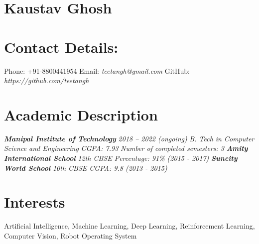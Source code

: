 \documentclass[a4paper,12pt]{article}
\begin{document}
    


\begin{multicols}{2}
\section*{\LARGE{Kaustav Ghosh}}
    \section*{Contact Details:}
        Phone: +91-8800441954
        \newline
        Email: \textit{teetangh@gmail.com}
        \newline
        GitHub: \textit{https://github.com/teetangh}
        \newline
        
    \section*{Academic Description}
        \textbf{\emph{Manipal Institute of Technology}}
        \newline
        \textit{2018 – 2022 (ongoing)}
        \newline
        \textit{B. Tech in Computer Science and Engineering}
        \newline
        \textit{CGPA: 7.93}
        \newline
        \textit{Number of completed semesters: 3}
        \newline
        \textbf{\emph{Amity International School}}
        \newline
        \textit{12th CBSE Percentage: 91\% (2015 - 2017)}
        \newline
        \textbf{\emph{Suncity World School}}
        \newline
        \textit{10th CBSE CGPA: 9.8 (2013 - 2015)}
\end{multicols}

\section*{Interests}
Artificial Intelligence,
Machine Learning,
Deep Learning,
Reinforcement Learning,
Computer Vision,
Robot Operating System
    
\end{document}

